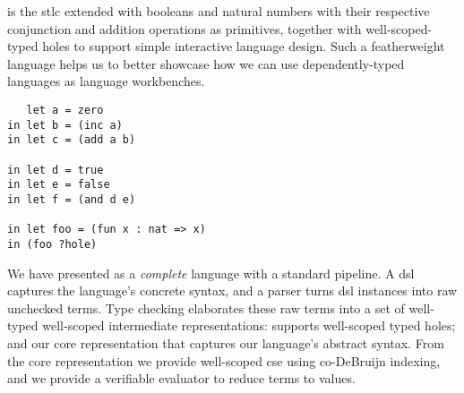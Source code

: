 

\Velo{} is the \ac{stlc} extended with booleans and natural numbers with their respective conjunction and addition operations as primitives, together with well-scoped-typed holes to support simple interactive language design.
Such a featherweight language helps us to better showcase how we can use dependently-typed languages as language workbenches.

\begin{verbatim}
   let a = zero
in let b = (inc a)
in let c = (add a b)

in let d = true
in let e = false
in let f = (and d e)

in let foo = (fun x : nat => x)
in (foo ?hole)

\end{verbatim}

We have presented \Velo{} as a \emph{complete} language with a standard pipeline.
A \ac{dsl} captures the language's concrete syntax, and a parser turns \ac{dsl} instances into raw unchecked terms.
Type checking elaborates these raw terms into a set of well-typed well-scoped intermediate representations:  supports well-scoped typed holes; and  our core representation that captures our language's abstract syntax.
From the core representation we provide well-scoped \ac{cse} using co-DeBruijn indexing, and we provide a verifiable evaluator to reduce terms to values.



